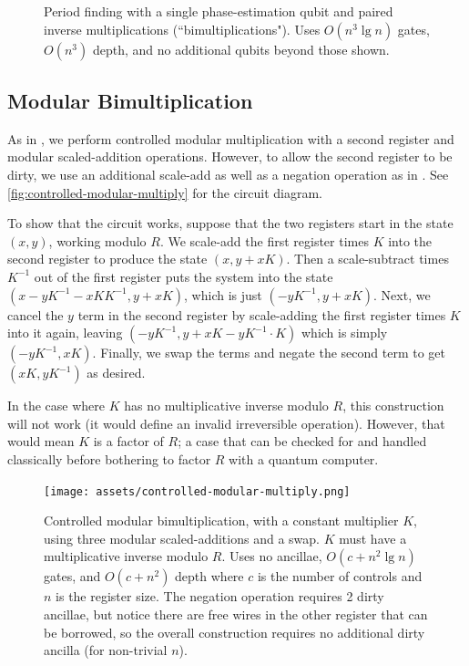 \documentclass[twocolumn,longbibliography]{quantumarticle-customized}
\begin{document}
\begin{figure}
  \centering
  \caption{
	Period finding with a single phase-estimation qubit and paired inverse multiplications (``bimultiplications").
	Uses $O(n^3 \lg n)$ gates, $O(n^3)$ depth, and no additional qubits beyond those shown.
  }
  \label{fig:period-finding-solo-phase-qubit-explicit-dirty-register}
\end{figure}


\subsection{Modular Bimultiplication}

As in \cite{beauregard2003}, we perform controlled modular multiplication with a second register and modular scaled-addition operations.
However, to allow the second register to be dirty, we use an additional scale-add as well as a negation operation as in \cite{zalka2006}.
See \autoref{fig:controlled-modular-multiply} for the circuit diagram.

To show that the circuit works, suppose that the two registers start in the state $(x, y)$, working modulo $R$.
We scale-add the first register times $K$ into the second register to produce the state $(x, y+xK)$.
Then a scale-subtract times $K^{-1}$ out of the first register puts the system into the state $(x-yK^{-1}-xKK^{-1}, y+xK)$, which is just $(-yK^{-1}, y+xK)$.
Next, we cancel the $y$ term in the second register by scale-adding the first register times $K$ into it again, leaving $(-yK^{-1}, y+xK-yK^{-1} \cdot K)$ which is simply $(-yK^{-1}, xK)$.
Finally, we swap the terms and negate the second term to get $(xK, yK^{-1})$ as desired.

In the case where $K$ has no multiplicative inverse modulo $R$, this construction will not work (it would define an invalid irreversible operation).
However, that would mean $K$ is a factor of $R$; a case that can be checked for and handled classically before bothering to factor $R$ with a quantum computer.

\begin{figure}
  \centering
  \texttt{[image: assets/controlled-modular-multiply.png]}
  \caption{
    Controlled modular bimultiplication, with a constant multiplier $K$, using three modular scaled-additions and a swap.
    $K$ must have a multiplicative inverse modulo $R$.
    Uses no ancillae, $O(c + n^2 \lg n)$ gates, and $O(c + n^2)$ depth where $c$ is the number of controls and $n$ is the register size.
    The negation operation requires 2 dirty ancillae, but notice there are free wires in the other register that can be borrowed, so the overall construction requires no additional dirty ancilla (for non-trivial $n$).
  }
  \label{fig:controlled-modular-multiply}
\end{figure}
\end{document}
